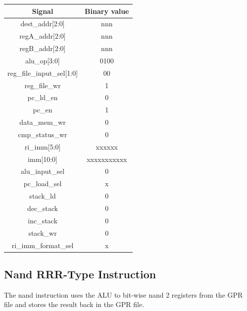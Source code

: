 \documentclass{article}
\begin{document}
\begin{par}
	\begin{center}
		\begin{tabular}{|c|c|}
			\hline 
			\textbf{Signal} & \textbf{Binary value} \\ 
			\hline 
			dest\_addr[2:0] & nnn \\ 
			\hline 
			regA\_addr[2:0] & nnn \\ 
			\hline 
			regB\_addr[2:0] & nnn \\ 
			\hline 
			alu\_op[3:0] & 0100 \\ 
			\hline 
			reg\_file\_input\_sel[1:0] & 00 \\ 
			\hline 
			reg\_file\_wr & 1 \\ 
			\hline 
			pc\_ld\_en & 0 \\ 
			\hline 
			pc\_en & 1 \\ 
			\hline 
			data\_mem\_wr & 0 \\ 
			\hline 
			cmp\_status\_wr & 0 \\ 
			\hline 
			ri\_imm[5:0] & xxxxxx \\ 
			\hline 
			imm[10:0] & xxxxxxxxxxx \\ 
			\hline 
			alu\_input\_sel & 0 \\ 
			\hline 
			pc\_load\_sel & x \\ 
			\hline 
			stack\_ld & 0 \\ 
			\hline 
			dec\_stack & 0 \\ 
			\hline 
			inc\_stack & 0 \\ 
			\hline 
			stack\_wr & 0 \\ 
			\hline 
			ri\_imm\_format\_sel & x \\ 
			\hline 
		\end{tabular} 
	\end{center}

	\newpage
	\subsection{Nand RRR-Type Instruction}
	
	The nand instruction uses the ALU to bit-wise nand 2 registers from the GPR file and stores the result back in the GPR file. \\
	

\end{par}
\end{document}
